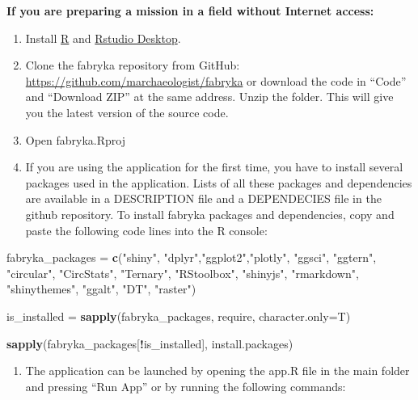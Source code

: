 \documentclass[
]{article}
\newenvironment{Shaded}{\begin{snugshade}}{\end{snugshade}}
\newcommand{\AttributeTok}[1]{\textcolor[rgb]{0.13,0.29,0.53}{#1}}
\newcommand{\FunctionTok}[1]{\textcolor[rgb]{0.13,0.29,0.53}{\textbf{#1}}}
\newcommand{\NormalTok}[1]{#1}
\newcommand{\OtherTok}[1]{\textcolor[rgb]{0.56,0.35,0.01}{#1}}
\newcommand{\SpecialCharTok}[1]{\textcolor[rgb]{0.81,0.36,0.00}{\textbf{#1}}}
\newcommand{\StringTok}[1]{\textcolor[rgb]{0.31,0.60,0.02}{#1}}
\providecommand{\tightlist}{%
  \setlength{\itemsep}{0pt}\setlength{\parskip}{0pt}}
\begin{document}
\textbf{If you are preparing a mission in a field without Internet
access:}

\begin{enumerate}
\def\labelenumi{\arabic{enumi}.}
\item
  Install \href{https://www.r-project.org}{R} and
  \href{https://posit.co/download/rstudio-desktop/}{Rstudio Desktop}.
\item
  Clone the fabryka repository from GitHub:
  \url{https://github.com/marchaeologist/fabryka} or download the code
  in ``Code'' and ``Download ZIP'' at the same address. Unzip the
  folder. This will give you the latest version of the source code.
\item
  Open fabryka.Rproj
\item
  If you are using the application for the first time, you have to
  install several packages used in the application. Lists of all these
  packages and dependencies are available in a DESCRIPTION file and a
  DEPENDECIES file in the github repository. To install fabryka packages
  and dependencies, copy and paste the following code lines into the R
  console:
\end{enumerate}

\begin{Shaded}
\begin{Highlighting}[]
\NormalTok{fabryka\_packages }\OtherTok{=} \FunctionTok{c}\NormalTok{(}\StringTok{"shiny"}\NormalTok{, }\StringTok{"dplyr"}\NormalTok{,}\StringTok{"ggplot2"}\NormalTok{,}\StringTok{"plotly"}\NormalTok{, }\StringTok{"ggsci"}\NormalTok{, }\StringTok{"ggtern"}\NormalTok{, }\StringTok{"circular"}\NormalTok{, }
                     \StringTok{"CircStats"}\NormalTok{, }\StringTok{"Ternary"}\NormalTok{, }\StringTok{"RStoolbox"}\NormalTok{, }\StringTok{"shinyjs"}\NormalTok{, }\StringTok{"rmarkdown"}\NormalTok{, }
                     \StringTok{"shinythemes"}\NormalTok{,  }\StringTok{"ggalt"}\NormalTok{, }\StringTok{"DT"}\NormalTok{, }\StringTok{"raster"}\NormalTok{)}

\NormalTok{is\_installed }\OtherTok{=} \FunctionTok{sapply}\NormalTok{(fabryka\_packages, require, }\AttributeTok{character.only=}\NormalTok{T)}

\FunctionTok{sapply}\NormalTok{(fabryka\_packages[}\SpecialCharTok{!}\NormalTok{is\_installed], install.packages)}
\end{Highlighting}
\end{Shaded}

\begin{enumerate}
\def\labelenumi{\arabic{enumi}.}
\setcounter{enumi}{4}
\tightlist
\item
  The application can be launched by opening the app.R file in the main
  folder and pressing ``Run App'' or by running the following commands:
\end{enumerate}
\end{document}
